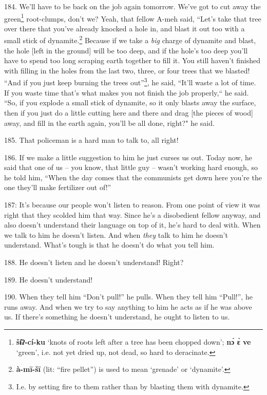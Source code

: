 184. We'll have to be back on the job again tomorrow. We've got to cut away the
green\footnote{\textbf{šɨ̂ʔ-cí-ku} `knots of roots left after a tree has been chopped down'; \textbf{nɔ́ ɛ̀ ve} `green', i.e. not yet dried up, not dead, so hard to deracinate.} root-clumps, don't we? Yeah, that fellow A-meh said, ``Let's
take that tree over there that you've already knocked a hole in, and blast it out
too with a small stick of dynamite.\footnote{\textbf{à-mī-šī} (lit: ``fire pellet'') is used to mean `grenade' or `dynamite'.} Because if we take a \textit{big} charge
of dynamite and blast, the hole [left in the ground] will be too deep, and if the
hole's too deep you'll have to spend too long scraping earth together to fill it.
You still haven't finished with filling in the holes from the last two, three,
or four trees that we blasted! ``And if you just keep burning the trees
out''\footnote{I.e. by setting fire to them rather than by blasting them with dynamite.}, he said, ``It'll waste a lot of time. If you waste time that's
what makes you not finish the job properly,`` he said. ``So, if
you explode a small stick of dynamite, so it only blasts away the surface, then
if you just do a little cutting here and there and drag [the pieces of wood] away,
and fill in the earth again, you'll be all done, right?" he said.

185. That policeman is a hard man to talk to, all right!

186. If we make a little suggestion to him he just curses us out. Today now, he
said that one of us -- you know, that little guy -- wasn't working hard enough,
so he told him, ``When the day comes that the communists get down here you're the
one they'll make fertilizer out of!''

 187: It's because our people won't listen to reason.
From one point of view it was right that they scolded him that way. Since he's
a disobedient fellow anyway, and also doesn't understand their language on top
of it, he's hard to deal with. When we talk to him he doesn't listen. And when
\textit{they} talk to him he doesn't understand. What's tough is that he doesn't
do what you tell him.

188. He doesn't listen and he doesn't understand! Right?

189. He doesn't understand!

190. When they tell him ``Don't pull!'' he pulls. When they tell
him ``Pull!'', he runs away. And when we try to say anything to
him he acts as if he was above us. If there's something he doesn't understand,
he ought to listen to us.

